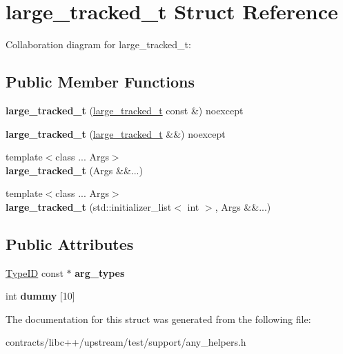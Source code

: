 \hypertarget{structlarge__tracked__t}{}\section{large\+\_\+tracked\+\_\+t Struct Reference}
\label{structlarge__tracked__t}


Collaboration diagram for large\+\_\+tracked\+\_\+t\+:
\subsection*{Public Member Functions}
\begin{DoxyCompactItemize}
\item 
\mbox{\label{structlarge__tracked__t_a32d52bae43488e2e6ba15cebd6b4cf0a}} 
{\bfseries large\+\_\+tracked\+\_\+t} (\mbox{\hyperlink{structlarge__tracked__t}{large\+\_\+tracked\+\_\+t}} const \&) noexcept
\item 
\mbox{\label{structlarge__tracked__t_ab2a5e2b447a55be2a5be7146e75334ed}} 
{\bfseries large\+\_\+tracked\+\_\+t} (\mbox{\hyperlink{structlarge__tracked__t}{large\+\_\+tracked\+\_\+t}} \&\&) noexcept
\item 
\mbox{\label{structlarge__tracked__t_a7b62f1709806247ac26f0aa88d8e62bc}} 
{\footnotesize template$<$class ... Args$>$ }\\{\bfseries large\+\_\+tracked\+\_\+t} (Args \&\&...)
\item 
\mbox{\label{structlarge__tracked__t_ad724a0337f084fd25dd84f117ae4201e}} 
{\footnotesize template$<$class ... Args$>$ }\\{\bfseries large\+\_\+tracked\+\_\+t} (std\+::initializer\+\_\+list$<$ int $>$, Args \&\&...)
\end{DoxyCompactItemize}
\subsection*{Public Attributes}
\begin{DoxyCompactItemize}
\item 
\mbox{\label{structlarge__tracked__t_ab5487dca544a78fdb019ba4efb3f1910}} 
\mbox{\hyperlink{struct_type_i_d}{Type\+ID}} const  $\ast$ {\bfseries arg\+\_\+types}
\item 
\mbox{\label{structlarge__tracked__t_a93092fff42a70bbbbf07536480d2a567}} 
int {\bfseries dummy} \mbox{[}10\mbox{]}
\end{DoxyCompactItemize}


The documentation for this struct was generated from the following file\+:\begin{DoxyCompactItemize}
\item 
contracts/libc++/upstream/test/support/any\+\_\+helpers.\+h\end{DoxyCompactItemize}
